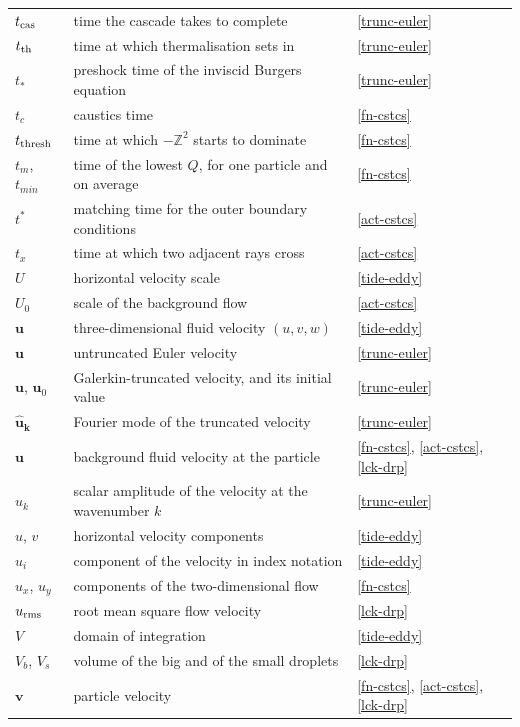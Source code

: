 \begin{longtable}{@{}p{}p{}p{}@{}}
$t_{\rm cas}$ & time the cascade takes to complete & \ref{trunc-euler} \\
$t_{\rm th}$ & time at which thermalisation sets in & \ref{trunc-euler} \\
$t_*$ & preshock time of the inviscid Burgers equation & \ref{trunc-euler} \\
$t_c$ & caustics time & \ref{fn-cstcs} \\
$t_{\rm thresh}$ & time at which $-\mathbb{Z}^2$ starts to dominate & \ref{fn-cstcs} \\
$t_m$, $t_{min}$ & time of the lowest $Q$, for one particle and on average & \ref{fn-cstcs} \\
$t^*$ & matching time for the outer boundary conditions & \ref{act-cstcs} \\
$t_x$ & time at which two adjacent rays cross & \ref{act-cstcs} \\
\addlinespace
$U$ & horizontal velocity scale & \ref{tide-eddy} \\
$U_0$ & scale of the background flow & \ref{act-cstcs} \\
$\boldsymbol{u}$ & three-dimensional fluid velocity $(u,v,w)$ & \ref{tide-eddy} \\
$\boldsymbol{u}$ & untruncated Euler velocity & \ref{trunc-euler} \\
$\mathbf{u}$, $\mathbf{u}_0$ & Galerkin-truncated velocity, and its initial value & \ref{trunc-euler} \\
$\widehat{\mathbf{u}}_{\mathbf{k}}$ & Fourier mode of the truncated velocity & \ref{trunc-euler} \\
$\boldsymbol{u}$ & background fluid velocity at the particle & \ref{fn-cstcs}, \ref{act-cstcs}, \ref{lck-drp} \\
$\hat{u}_k$ & scalar amplitude of the velocity at the wavenumber $k$ & \ref{trunc-euler} \\
$u$, $v$ & horizontal velocity components & \ref{tide-eddy} \\
$u_i$ & component of the velocity in index notation & \ref{tide-eddy} \\
$u_x$, $u_y$ & components of the two-dimensional flow & \ref{fn-cstcs} \\
$u_{\rm rms}$ & root mean square flow velocity & \ref{lck-drp} \\
\addlinespace
$V$ & domain of integration & \ref{tide-eddy} \\
$V_b$, $V_s$ & volume of the big and of the small droplets & \ref{lck-drp} \\
$\boldsymbol{v}$ & particle velocity & \ref{fn-cstcs}, \ref{act-cstcs}, \ref{lck-drp} \\

\end{longtable}
